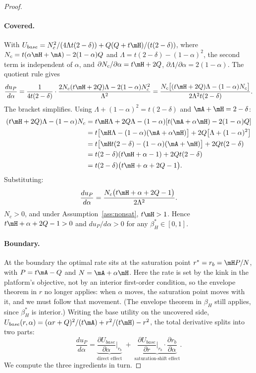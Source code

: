 \begin{proof}
\paragraph{Covered.}\;
With $U_{base} = N_c^2/(4\Lambda t(2-\delta)) + Q(Q + t\mH)/(t(2-\delta))$, where $N_c = t(\alpha\mH + \mA) - 2(1-\alpha)Q$ and $\Lambda = t(2-\delta) - (1-\alpha)^2$, the second term is independent of $\alpha$, and $\partial N_c/\partial\alpha = t\mH + 2Q$, $\partial\Lambda/\partial\alpha = 2(1-\alpha)$. The quotient rule gives
\[
\frac{du_P}{d\alpha}
= \frac{1}{4t(2-\delta)}\cdot\frac{2 N_c(t\mH + 2Q)\Lambda - 2(1-\alpha) N_c^2}{\Lambda^2}
= \frac{N_c\bigl[(t\mH + 2Q)\Lambda - (1-\alpha) N_c\bigr]}{2\Lambda^2 t (2-\delta)}.
\]
The bracket simplifies. Using $\Lambda + (1-\alpha)^2 = t(2-\delta)$ and $\mA + \mH = 2 - \delta$:
\begin{align*}
(t\mH + 2Q)\Lambda - (1-\alpha) N_c
&= t\mH\Lambda + 2Q\Lambda -(1-\alpha)[t(\mA+\alpha\mH)-2(1-\alpha)Q]
\\
&= t\bigl[\mH\Lambda - (1-\alpha)(\mA+\alpha\mH)\bigr] + 2Q\bigl[\Lambda + (1-\alpha)^2\bigr] \\
&= t\bigl[\mH t(2-\delta) - (1-\alpha)(\mA + \mH)\bigr] + 2Qt(2-\delta) \\
&= t(2-\delta)(t\mH + \alpha - 1) + 2Qt(2-\delta) \\
&= t(2-\delta)\bigl(t\mH + \alpha + 2Q - 1\bigr).
\end{align*}
Substituting:
\[
\frac{du_P}{d\alpha}
= \frac{N_c\bigl(t\mH + \alpha + 2Q - 1\bigr)}{2\Lambda^2}.
\]
$N_c > 0$, and under Assumption~\ref{ass:nonsat}, $t\mH > 1$. Hence $t\mH + \alpha + 2Q - 1 > 0$ and $du_P/d\alpha > 0$ for any $\beta_H^* \in [0,1]$.

\paragraph{Boundary.}
At the boundary the optimal rate sits at the saturation point
$r^* = r_b = \mH P/N$, with $P = t\mA - Q$ and $N = \mA + \alpha\mH$.
Here the rate is set by the kink in the platform's objective, not by an
interior first-order condition, so the envelope theorem in $r$ no longer
applies: when $\alpha$ moves, the saturation point moves with it, and we
must follow that movement. (The envelope theorem in $\beta_H$ still
applies, since $\beta_H^*$ is interior.) Writing the base utility on the
uncovered side,
$U_{base}(r,\alpha) = (\alpha r + Q)^2/(t\mA) + r^2/(t\mH) - r^2$,
the total derivative splits into two parts:
\[
\frac{du_P}{d\alpha}
= \underbrace{\frac{\partial U_{base}}{\partial\alpha}\bigg|_{r_b}}_{\text{direct effect}}
\;+\;
\underbrace{\frac{\partial U_{base}}{\partial r}\bigg|_{r_b}\cdot\frac{\partial r_b}{\partial\alpha}}_{\text{saturation-shift effect}}.
\]
We compute the three ingredients in turn.


\end{proof}
